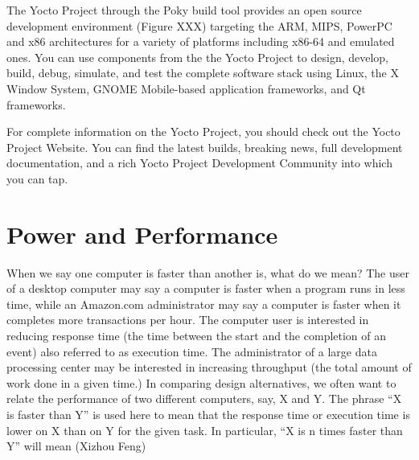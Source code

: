 The Yocto Project through the Poky build tool provides an open source
development environment (Figure XXX) targeting the ARM, MIPS, PowerPC and x86 
architectures for a variety of platforms including x86-64 and emulated ones. 
You can use components from the the Yocto Project to design, develop, build, 
debug, simulate, and test the complete software stack using Linux, the X Window
System, GNOME Mobile-based application frameworks, and Qt frameworks. 

For complete information on the Yocto Project, you should check out the Yocto
Project Website. You can find the latest builds, breaking news, full
development documentation, and a rich Yocto Project Development Community into
which you can tap.


\section{Power and Performance}

\noindent
When we say one computer is faster than another is, what do we mean? The user
of a desktop computer may say a computer is faster when a program runs in less
time, while an Amazon.com administrator may say a computer is faster when it
completes more transactions per hour. The computer user is interested in 
reducing response time (the time between the start and the completion of an 
event) also referred to as execution time. The administrator of a large data 
processing center may be interested in increasing throughput (the total amount 
of work done in a given time.) In comparing design alternatives, we often want
to relate the performance of two different computers, say, X and Y. The phrase 
“X is faster than Y” is used here to mean that the response time or execution 
time is lower on X than on Y for the given task. In particular, “X is n times 
faster than Y” will mean (Xizhou Feng)



\clearpage
